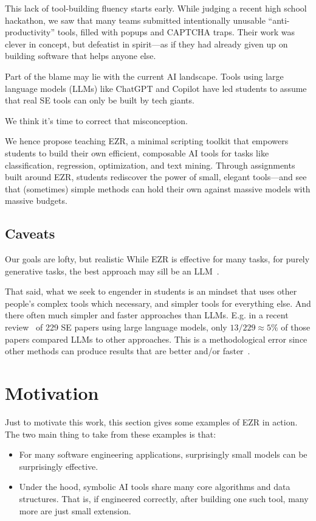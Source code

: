 \documentclass[AMA,STIX2COL]{WileyNJDv5}
\newcommand{\IT}{{\sffamily EZR}}
\begin{document}
This lack of tool-building fluency starts early. While judging  a recent high school hackathon, we saw that many teams submitted intentionally unusable “anti-productivity” tools, filled with popups and CAPTCHA traps. Their work was clever in concept, but defeatist in spirit—as if they had  already given up on building software that helps anyone else.

Part of the blame may lie with the current AI landscape.
Tools using large language models (LLMs)  like ChatGPT and Copilot have led students to assume that real SE tools can only be built by tech giants.

We think it’s time to correct that misconception.


We hence propose teaching {\IT}, a minimal scripting toolkit that empowers students to build their own efficient, composable AI tools for tasks like classification, regression, optimization, and text mining. Through assignments built around {\IT}, students rediscover the power of small, elegant tools—and see that (sometimes) simple methods can hold their own against massive models with massive budgets.

 




\subsection{Caveats}
Our goals are lofty, but realistic
While {\IT} is effective for many tasks, for purely generative
tasks, the best approach may sill  be an LLM~\cite{gros2020code}. 

That said, what we seek to engender in students is an    mindset   that uses other people's complex tools which necessary, and simpler tools for everything else.
And there often much simpler and faster approaches than LLMs.   
E.g. in a recent   review~\cite{Hou24} of 229 SE papers using large language models,  only $13/229 \approx 5\%$ of those papers compared LLMs to other approaches. This is a methodological error
since   other methods  can
 produce results that are better and/or 
faster~\cite{grinsztajn2022why,somvanshi2024survey,Tawosi23,majumder2018500+,Ling24,Fu17,johnson2024ai}.   

\section{Motivation}
Just to motivate  this work, this section gives some examples of EZR in action.
The two main thing to take from these examples is that:
\begin{itemize}
\item
For many software engineering
applications, surprisingly small models can be surprisingly effective.
\item
  Under the hood, symbolic AI tools share many core algorithms 
and data structures. That is, if engineered correctly, after building one such tool,
many more are just small extension. 
\end{itemize}
\end{document}
